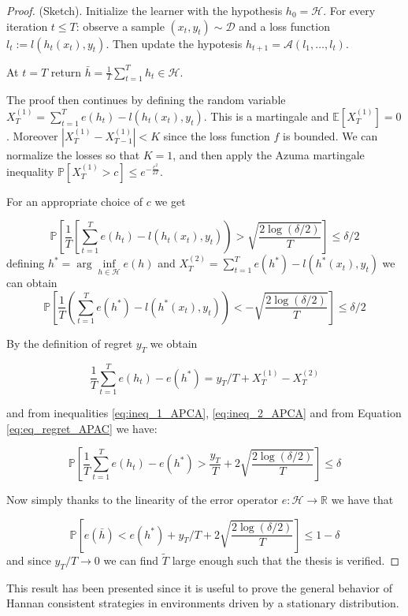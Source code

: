 \begin{proof}(Sketch).
Initialize the learner with the hypothesis $h_0=\mathcal H$.
For every iteration $t\le T$: observe a sample $(x_t,y_t)\sim\mathcal D$ and a loss function $l_t:=l(h_t(x_t),y_t)$. Then update the hypotesis $h_{t+1}=\mathcal A(l_1,\ldots,l_t)$.

At $t=T$ return $\bar{h}=\frac{1}{T}\sum\limits_{t=1}^T h_t\in\mathcal H$. 

The proof then continues by defining the random variable $X^{(1)}_T=\sum\limits_{t=1}^Te(h_t)-l(h_t(x_t),y_t)$. This is a martingale and $\mathbb E[X^{(1)}_T]=0$. Moreover $|X^{(1)}_T-X^{(1)}_{T-1}|<K$ since the loss function $f$ is bounded. We can normalize the losses so that $K=1$, and then apply the Azuma martingale inequality $\mathbb P[X^{(1)}_T>c]\le e^{-\frac{c^2}{2T}}$.

For an appropriate choice of $c$ we get

\begin{equation}\label{eq:ineq_1_APCA}
\mathbb P\left[\frac{1}{T}\left[\sum\limits_{t=1}^Te(h_t)-l(h_t(x_t),y_t)\right)>\sqrt{\frac{2\log(\delta/2)}{T}}\right]\le \delta/2
\end{equation}
defining $h^*=\arg\inf\limits_{h\in\mathcal H} e(h)$ and $X^{(2)}_T=\sum\limits_{t=1}^Te(h^*)-l(h^*(x_t),y_t)$ we can obtain
\begin{equation}\label{eq:ineq_2_APCA}
\mathbb P\left[\frac{1}{T}\left(\sum\limits_{t=1}^Te(h^*)-l(h^*(x_t),y_t)\right)<-\sqrt{\frac{2\log(\delta/2)}{T}}\right]\le \delta/2
\end{equation}

By the definition of regret $y_T$ we obtain

\begin{equation}\label{eq:eq_regret_APAC}
\frac{1}{T}\sum\limits_{t=1}^Te(h_t)-e(h^*)=y_T/T+X_T^{(1)}-X_T^{(2)}
\end{equation}

and from inequalities \eqref{eq:ineq_1_APCA}, \eqref{eq:ineq_2_APCA} and from Equation \eqref{eq:eq_regret_APAC} we have:

\begin{equation}
\mathbb P\left[\frac{1}{T}\sum\limits_{t=1}^Te(h_t)-e(h^*)>\frac{y_T}{T}+2\sqrt{\frac{2\log(\delta/2)}{T}}\right]\le \delta
\end{equation}

Now simply thanks to the linearity of the error operator $e:\mathcal H\to \mathbb R$ we have that 

$$\mathbb P\left[e(\bar h)<e(h^*)+y_T/T+2\sqrt{\frac{2\log(\delta/2)}{T}}\right]\le 1-\delta$$
and since $y_T/T\to0$ we can find $\tilde T$ large enough such that the thesis is verified.
\end{proof}

This result has been presented since it is useful to prove the general behavior of Hannan consistent strategies in environments driven by a stationary distribution.